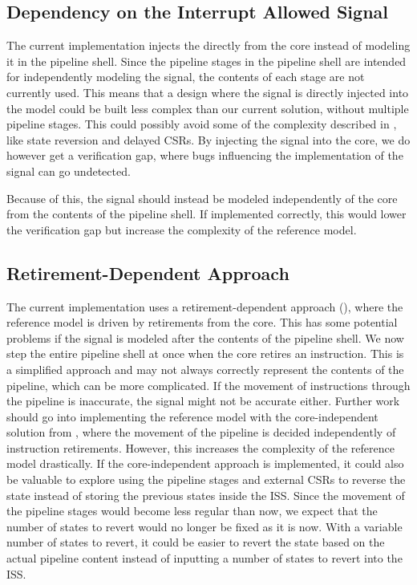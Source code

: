 \subsection{Dependency on the Interrupt Allowed Signal}

The current implementation injects the  directly from the core instead of modeling it in the pipeline shell. Since the pipeline stages in the pipeline shell are intended for independently modeling the  signal, the contents of each stage are not currently used. This means that a design where the  signal is directly injected into the model could be built less complex than our current solution, without multiple pipeline stages. This could possibly avoid some of the complexity described in , like state reversion and delayed CSRs. By injecting the  signal into the core, we do however get a verification gap, where bugs influencing the implementation of the  signal can go undetected.

Because of this, the  signal should instead be modeled independently of the core from the contents of the pipeline shell. If implemented correctly, this would lower the verification gap but increase the complexity of the reference model. 

\subsection{Retirement-Dependent Approach}

The current implementation uses a retirement-dependent approach (), where the reference model is driven by retirements from the core. This has some potential problems if the  signal is modeled after the contents of the pipeline shell. We now step the entire pipeline shell at once when the core retires an instruction. This is a simplified approach and may not always correctly represent the contents of the pipeline, which can be more complicated. If the movement of instructions through the pipeline is inaccurate, the  signal might not be accurate either. Further work should go into implementing the reference model with the core-independent solution from , where the movement of the pipeline is decided independently of instruction retirements. However, this increases the complexity of the reference model drastically. If the core-independent approach is implemented, it could also be valuable to explore using the pipeline stages and external CSRs to reverse the state instead of storing the previous states inside the ISS. Since the movement of the pipeline stages would become less regular than now, we expect that the number of states to revert would no longer be fixed as it is now. With a variable number of states to revert, it could be easier to revert the state based on the actual pipeline content instead of inputting a number of states to revert into the ISS. 

